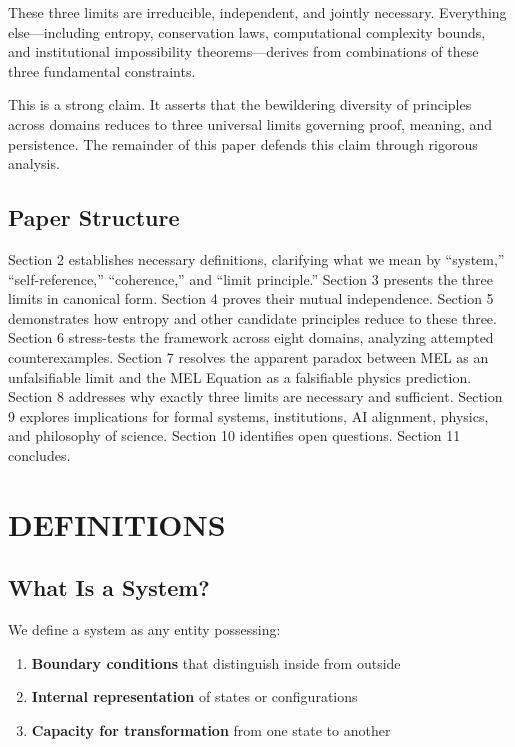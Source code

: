\documentclass[12pt]{article}
\begin{document}
These three limits are irreducible, independent, and jointly necessary. Everything else—including entropy, conservation laws, computational complexity bounds, and institutional impossibility theorems—derives from combinations of these three fundamental constraints.

This is a strong claim. It asserts that the bewildering diversity of principles across domains reduces to three universal limits governing proof, meaning, and persistence. The remainder of this paper defends this claim through rigorous analysis.

\subsection{Paper Structure}

Section 2 establishes necessary definitions, clarifying what we mean by ``system,'' ``self-reference,'' ``coherence,'' and ``limit principle.'' Section 3 presents the three limits in canonical form. Section 4 proves their mutual independence. Section 5 demonstrates how entropy and other candidate principles reduce to these three. Section 6 stress-tests the framework across eight domains, analyzing attempted counterexamples. Section 7 resolves the apparent paradox between MEL as an unfalsifiable limit and the MEL Equation as a falsifiable physics prediction. Section 8 addresses why exactly three limits are necessary and sufficient. Section 9 explores implications for formal systems, institutions, AI alignment, physics, and philosophy of science. Section 10 identifies open questions. Section 11 concludes.

\section{DEFINITIONS}

\subsection{What Is a System?}

We define a system as any entity possessing:

\begin{enumerate}
    \item \textbf{Boundary conditions} that distinguish inside from outside
    \item \textbf{Internal representation} of states or configurations
    \item \textbf{Capacity for transformation} from one state to another
\end{enumerate}
\end{document}
